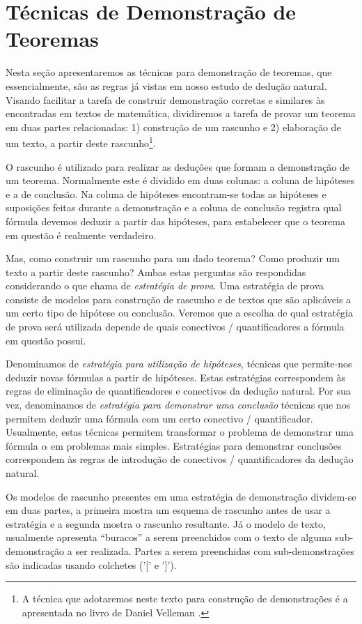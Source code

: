 \section{Técnicas de Demonstração de Teoremas}

Nesta seção apresentaremos as técnicas para demonstração de teoremas,
que essencialmente, são as regras já vistas em nosso estudo de dedução natural.
Visando facilitar a tarefa de construir demonstração corretas e similares
às encontradas em textos de matemática, dividiremos a tarefa de
provar um teorema em duas partes relacionadas: 1) construção de um
rascunho e 2) elaboração de um texto, a partir deste rascunho\footnote{A
  técnica que adotaremos neste texto para construção de demonstrações
  é a apresentada no livro de Daniel Velleman \cite{Velleman06}.}.

O rascunho é utilizado para realizar as deduções que formam a
demonstração de um teorema. Normalmente este é dividido em duas
colunas: a coluna de hipóteses e a de conclusão. Na coluna de hipóteses
encontram-se todas as hipóteses e suposições feitas durante a
demonstração e a coluna de conclusão registra qual fórmula devemos
deduzir a partir das hipóteses, para estabelecer que o teorema em
questão é realmente verdadeiro.

Mas, como construir um rascunho para um dado teorema? Como produzir um
texto a partir deste rascunho? Ambas estas perguntas são respondidas
considerando o que \cite{Velleman06} chama de \emph{estratégia de
  prova}. Uma estratégia de prova consiste de modelos para construção de
rascunho e de textos que são aplicáveis a um certo tipo de hipótese ou
conclusão. Veremos que a escolha de qual estratégia de prova será
utilizada depende de quais conectivos / quantificadores a fórmula em
questão possui.

Denominamos de \emph{estratégia para utilização de
hipóteses}, técnicas que permite-nos deduzir novas fórmulas a partir de
hipóteses. Estas estratégias correspondem às regras de eliminação de
quantificadores e conectivos da dedução natural. Por sua vez,
denominamos de \emph{estratégia para demonstrar uma conclusão}
técnicas que nos permitem deduzir uma fórmula com um certo conectivo /
quantificador. Usualmente, estas técnicas permitem transformar o
problema de demonstrar uma fórmula $\alpha$ em problemas mais
simples. Estratégias para demonstrar conclusões correspondem às regras
de introdução de conectivos / quantificadores da dedução natural.

Os modelos de rascunho presentes em uma estratégia de demonstração
dividem-se em duas partes, a primeira mostra um esquema de rascunho
antes de usar a estratégia e a segunda mostra o rascunho
resultante. Já o modelo de texto, usualmente apresenta ``buracos''  a
serem preenchidos com o texto de alguma sub-demonstração a ser
realizada. Partes a serem preenchidas com sub-demonstrações são
indicadas usando colchetes ('[' e ']').


